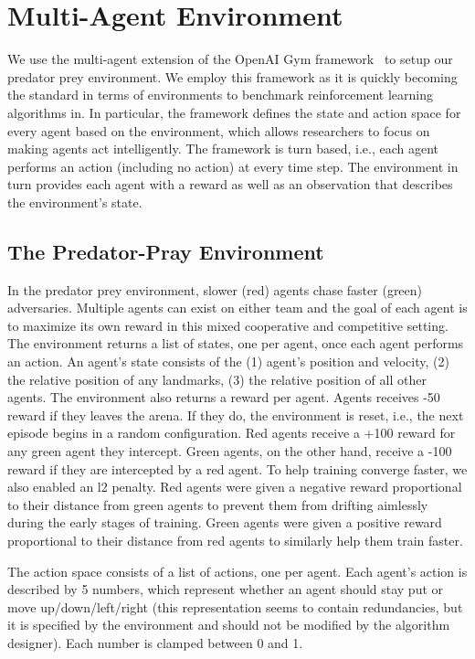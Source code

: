 
\section{Multi-Agent Environment}

We use the multi-agent extension of the OpenAI Gym framework~\cite{gym.openai16} to setup our predator prey environment. We employ this framework as it is quickly becoming the standard in terms of environments to benchmark reinforcement learning algorithms in. In particular, the framework defines the state and action space for every agent based on the environment, which allows researchers to focus on making agents act intelligently. The framework is turn based, i.e., each agent performs an action (including no action) at every time step. The environment in turn provides each agent with a reward as well as an observation that describes the environment's state.

\subsection{The Predator-Pray Environment}

In the predator prey environment, slower (red) agents chase faster (green) adversaries. Multiple agents can exist on either team and the goal of each agent is to maximize its own reward in this mixed cooperative and competitive setting. The environment returns a list of states, one per agent, once each agent performs an action. An agent's state consists of the (1) agent's position and velocity, (2) the relative position of any landmarks, (3) the relative position of all other agents. The environment also returns a reward per agent. Agents receives -50 reward if they leaves the arena. If they do, the environment is reset, i.e., the next episode begins in a random configuration. Red agents receive a +100 reward for any green agent they intercept. Green agents, on the other hand, receive a -100 reward if they are intercepted by a red agent. To help training converge faster, we also enabled an l2 penalty. Red agents were given a negative reward proportional to their distance from green agents to prevent them from drifting aimlessly during the early stages of training. Green agents were given a positive reward proportional to their distance from red agents to similarly help them train faster.

The action space consists of a list of actions, one per agent. Each agent's action is described by 5 numbers, which represent whether an agent should stay put or move up/down/left/right (this representation seems to contain redundancies, but it is specified by the environment and should not be modified by the algorithm designer). Each number is clamped between 0 and 1. 

